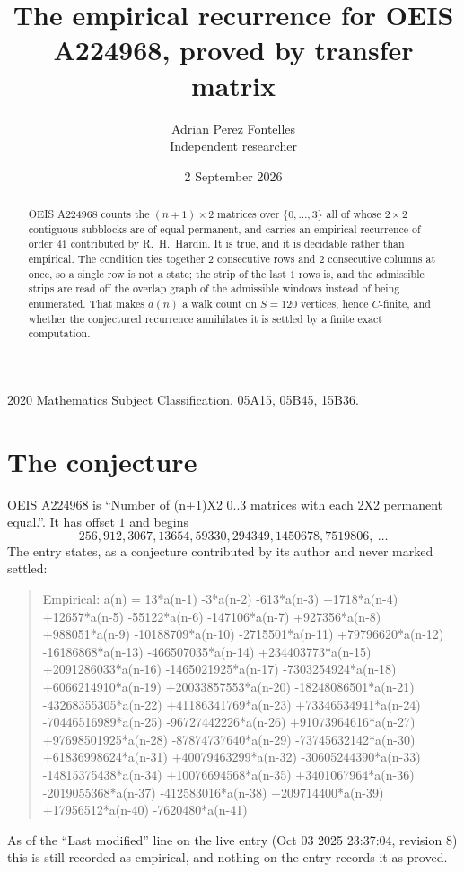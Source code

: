 \documentclass[11pt,a4paper]{article}
\title{The empirical recurrence for OEIS A224968, proved by transfer matrix}
\author{Adrian Perez Fontelles\\ \small Independent researcher}
\date{2 September 2026}
\theoremstyle{plain}
\theoremstyle{definition}
\begin{document}
\maketitle

\begin{abstract}
OEIS A224968 counts the $(n+1)\times2$ matrices over $\{0,\dots,3\}$ all of whose
$2\times2$ contiguous subblocks are of equal permanent, and carries an empirical recurrence of order
$41$ contributed by R.~H.~Hardin. It is true, and it is decidable rather than empirical.
The condition ties together $2$ consecutive rows and $2$ consecutive columns at once, so a
single row is not a state; the strip of the last $1$ rows is, and the admissible strips
are read off the overlap graph of the admissible windows instead of being enumerated. That
makes $a(n)$ a walk count on $S=120$ vertices, hence $C$-finite, and whether the conjectured
recurrence annihilates it is settled by a finite exact computation.
\end{abstract}

\noindent\small 2020 Mathematics Subject Classification. 05A15, 05B45, 15B36.\normalsize

\section{The conjecture}

OEIS A224968 is ``Number of (n+1)X2 0..3 matrices with each 2X2 permanent equal.''. It has offset $1$ and begins
\[
256, 912, 3067, 13654, 59330, 294349, 1450678, 7519806,\ \dots
\]
The entry states, as a conjecture contributed by its author and never marked settled:
\begin{quote}
Empirical: a(n) = 13*a(n-1) -3*a(n-2) -613*a(n-3) +1718*a(n-4) +12657*a(n-5) -55122*a(n-6) -147106*a(n-7) +927356*a(n-8) +988051*a(n-9) -10188709*a(n-10) -2715501*a(n-11) +79796620*a(n-12) -16186868*a(n-13) -466507035*a(n-14) +234403773*a(n-15) +2091286033*a(n-16) -1465021925*a(n-17) -7303254924*a(n-18) +6066214910*a(n-19) +20033857553*a(n-20) -18248086501*a(n-21) -43268355305*a(n-22) +41186341769*a(n-23) +73346534941*a(n-24) -70446516989*a(n-25) -96727442226*a(n-26) +91073964616*a(n-27) +97698501925*a(n-28) -87874737640*a(n-29) -73745632142*a(n-30) +61836998624*a(n-31) +40079463299*a(n-32) -30605244390*a(n-33) -14815375438*a(n-34) +10076694568*a(n-35) +3401067964*a(n-36) -2019055368*a(n-37) -412583016*a(n-38) +209714400*a(n-39) +17956512*a(n-40) -7620480*a(n-41)
\end{quote}
As of the ``Last modified'' line on the live entry (Oct 03 2025 23:37:04, revision 8) this is still
recorded as empirical, and nothing on the entry records it as proved.
\end{document}
